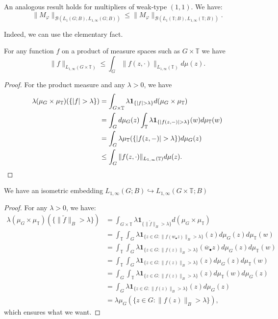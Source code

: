     \begin{remark}
        An analogous result holds for multipliers of weak-type $(1,1)$. We have:
        \[  \|M_\varphi\|_{\mathcal{B}(L_1(G;B),L_{1,\infty}(G;B))}\leq\|M_\varphi\|_{\mathcal{B}(L_1(\mathbb{T};B),L_{1,\infty}(\mathbb{T};B))}.\]
    \end{remark}
    Indeed, we can use the elementary fact.
    \begin{lemma}
        For any function $f$ on a product of measure spaces such as $G\times\mathbb{T}$ we have
        \[  \|f\|_{L_{1,\infty}(G\times\mathbb{T})}\leq\int_{G}\|f(z,\cdot)\|_{L_{1,\infty}(\mathbb{T})}d\mu(z).     \]
    \end{lemma}
    \begin{proof}
        For the product measure and any $\lambda>0$, we have
        \begin{align*}
            \lambda(\mu_{G}\times\mu_{\mathbb{T}})(\{|f|>\lambda\})
              &=\int_{G\times\mathbb{T}}\lambda\mathbf{1}_{\{|f|>\lambda\}}d(\mu_G\times\mu_{\mathbb{T}})
            \\&=\int_{G}d\mu_G(z)\int_{\mathbb{T}}\lambda\mathbf{1}_{\{|f(z,-)|>\lambda\}}(w)d\mu_{\mathbb{T}}(w)
            \\&= \int_{G}\lambda\mu_{\mathbb{T}}({\{|f(z,-)|>\lambda\}})d\mu_G(z)
            \\&\leq \int_{G}\|f(z,\cdot)\|_{L_{1,\infty}(\mathbb{T})}d\mu(z).\qedhere
        \end{align*}
    \end{proof}
    \begin{lemma}
        We have an isometric embedding $L_{1,\infty}(G;B)\hookrightarrow L_{1,\infty}(G\times\mathbb{T};B)$
    \end{lemma}
    \begin{proof}
        For any $\lambda>0$, we have:
            \begin{align*}
                \lambda(\mu_{G}\times\mu_{\mathbb{T}})(\{\|\widetilde{f}\|_B>\lambda\})
                  &=\int_{G\times\mathbb{T}}\lambda\mathbf{1}_{\{\|\widetilde{f}\|_B>\lambda\}}d(\mu_G\times\mu_{\mathbb{T}})
                \\&=\int_{\mathbb{T}}\int_{G}\lambda\mathbf{1}_{\{z\in G\colon\|f(w_{\bullet}z)\|_B>\lambda\}}(z)d\mu_G(z)d\mu_{\mathbb{T}}(w)
                \\&=\int_{\mathbb{T}}\int_{G}\lambda\mathbf{1}_{\{z\in G\colon \|f(z)\|_B>\lambda\}}(\overline{w}_{\bullet}z)d\mu_{G}(z)d\mu_{\mathbb{T}}(w)
                \\&=\int_{\mathbb{T}}\int_{G}\lambda\mathbf{1}_{\{z\in G\colon \|f(z)\|_B>\lambda\}}(z)d\mu_{G}(z)d\mu_{\mathbb{T}}(w)
                \\&=\int_{G}\int_{\mathbb{T}}\lambda\mathbf{1}_{\{z\in G\colon \|f(z)\|_B>\lambda\}}(z)d\mu_{\mathbb{T}}(w)d\mu_G(z)
                \\&=\int_{G}\lambda\mathbf{1}_{\{z\in G\colon \|f(z)\|_B>\lambda\}}(z)d\mu_G(z)
                \\&=\lambda\mu_{G}(\{z\in G\colon \|f(z)\|_B>\lambda\}),
            \end{align*}
        which ensures what we want.
    \end{proof}
